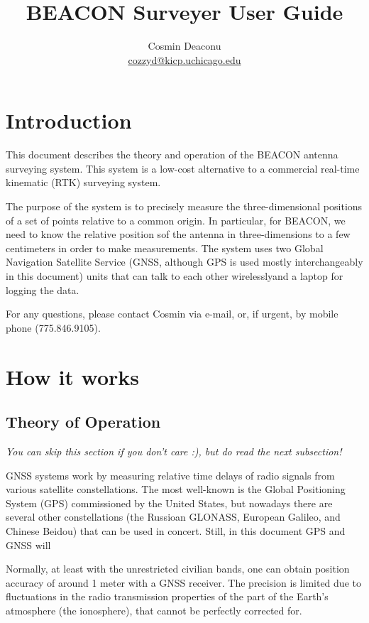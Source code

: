 \documentclass[usletter]{article}
\title{BEACON Surveyer User Guide}
\author{Cosmin Deaconu
\\ \href{mailto:cozzyd@kicp.uchicago.edu}{cozzyd@kicp.uchicago.edu} 
}
\begin{document}
 

\maketitle

\tableofcontents

\section{Introduction} 

This document describes the theory and operation of the BEACON antenna surveying system.
This system is a low-cost alternative to a commercial real-time kinematic (RTK)
surveying system.  

The purpose of the system is to precisely measure the three-dimensional
positions  of a set of points relative to a common origin. In particular, for
BEACON, we need to know the relative position sof the antenna in
three-dimensions to a few centimeters in order to make measurements.  The
system uses two Global Navigation Satellite Service (GNSS, although GPS is used mostly interchangeably in this document) units that can talk to each other wirelesslyand a laptop
for logging the data. 

For any questions, please contact Cosmin via e-mail, or, if urgent, by mobile phone (775.846.9105).


\section{How it works} 


\subsection{Theory of Operation} 

\textit{You can skip this section if you don't care :), but do read the next subsection!} 

GNSS systems work by measuring relative time delays of radio signals from
various satellite constellations. The most well-known is the Global Positioning
System (GPS) commissioned by the United States, but nowadays there are several
other constellations (the Russioan GLONASS, European Galileo, and Chinese
Beidou) that can be used in concert. Still, in this document GPS and GNSS will 

Normally, at least with the unrestricted civilian bands, one can obtain
position accuracy of around 1 meter with a GNSS receiver. The precision is limited
due to fluctuations in the radio transmission properties of the part of the
Earth's atmosphere (the ionosphere), that cannot be perfectly corrected for. 
\end{document}
